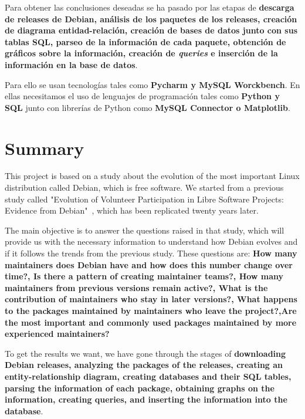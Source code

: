 \documentclass[a4paper, 12pt]{book}
\begin{document}
Para obtener las conclusiones deseadas se ha pasado por las etapas de \textbf {descarga de releases de Debian, análisis de los paquetes de los releases, creación de diagrama entidad-relación, creación de bases de datos junto con sus tablas SQL, parseo de la información de cada paquete, obtención de gráficos sobre la información, creación de \emph{queries} e inserción de la información en la base de datos}.

Para ello se usan tecnologías tales como \textbf {Pycharm y MySQL Worckbench}.
En ellas necesitamos el uso de lenguajes de programación tales como \textbf {Python y SQL} junto con librerías de Python como \textbf {MySQL Connector o Matplotlib}.



\chapter*{Summary}
This project is based on a study about the evolution of the most important Linux distribution called Debian, which is free software. We started from a previous study called "Evolution of Volunteer Participation in Libre Software Projects: Evidence from Debian"~\cite{robles05:_debian}, which has been replicated twenty years later.

The main objective is to answer the questions raised in that study, which will provide us with the necessary information to understand how Debian evolves and if it follows the trends from the previous study.
These questions are: \textbf{How many maintainers does Debian have and how does this number change over time?, Is there a pattern of creating maintainer teams?, How many maintainers from previous versions remain active?, What is the contribution of maintainers who stay in later versions?, What happens to the packages maintained by maintainers who leave the project?,Are the most important and commonly used packages maintained by more experienced maintainers?}

To get the results we want, we have gone through the stages of \textbf{downloading Debian releases, analyzing the packages of the releases, creating an entity-relationship diagram, creating databases and their SQL tables, parsing the information of each package, obtaining graphs on the information, creating queries, and inserting the information into the database}.
\end{document}
